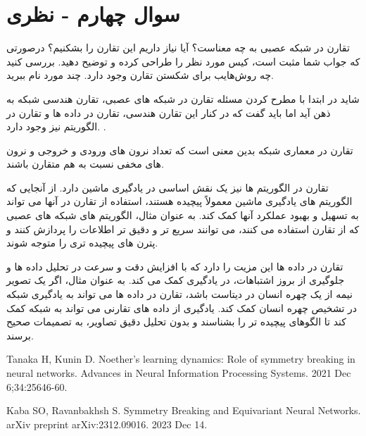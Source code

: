 \section{سوال چهارم - نظری}

تقارن در شبکه عصبی به چه معناست؟ آیا نیاز داریم این تقارن را بشکنیم؟ درصورتی که جواب شما مثبت است، کیس مورد نظر را طراحی کرده و توضیح دهید. بررسی کنید چه روش‌هایب برای شکستن تقارن وجود دارد. چند مورد نام ببرید.





\begin{qsolve}
 	شاید در ابتدا با مطرح کردن مسئله تقارن در شبکه های عصبی، تقارن هندسی شبکه به ذهن آید اما باید گفت که در کنار این تقارن هندسی، تقارن در داده ها و تقارن در الگوریتم نیز وجود دارد. \cite{ref1}.
 	
 	تقارن در معماری شبکه بدین معنی است که تعداد نرون های ورودی و خروجی و نرون های مخفی نسبت به هم متقارن باشند. 
 	
 	تقارن در الگوریتم ها نیز یک نقش اساسی در یادگیری ماشین دارد. از آنجایی که الگوریتم های یادگیری ماشین معمولاً پیچیده هستند، استفاده از تقارن در آنها می تواند به تسهیل و بهبود عملکرد آنها کمک کند. به عنوان مثال، الگوریتم های شبکه های عصبی که از تقارن استفاده می کنند، می توانند سریع تر و دقیق تر اطلاعات را پردازش کنند و پترن های پیچیده تری را متوجه شوند.
 	
 	تقارن در داده ها این مزیت را دارد که با افزایش دقت و سرعت در تحلیل داده ها و جلوگیری از بروز اشتباهات، در یادگیری کمک می کند. به عنوان مثال، اگر یک تصویر نیمه از یک چهره انسان در دیتاست باشد، تقارن در داده ها می تواند به یادگیری شبکه در تشخیص چهره انسان کمک کند. یادگیری از داده های تقارنی می تواند به شبکه کمک کند تا الگوهای پیچیده تر را بشناسند و بدون تحلیل دقیق تصاویر، به تصمیمات صحیح برسند.
 	
 	



\end{qsolve}

















\begin{latin}
	\begin{thebibliography}{9}
		Tanaka H, Kunin D. Noether’s learning dynamics: Role of symmetry breaking in neural networks. Advances in Neural Information Processing Systems. 2021 Dec 6;34:25646-60.
		
		Kaba SO, Ravanbakhsh S. Symmetry Breaking and Equivariant Neural Networks. arXiv preprint arXiv:2312.09016. 2023 Dec 14.
	\end{thebibliography} 
\end{latin}